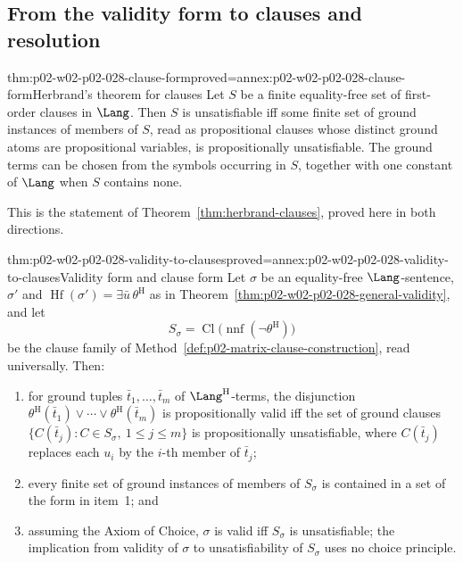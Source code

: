 \subsection{From the validity form to clauses and resolution}
\label{sec:p02-w02-p02-028-clauses}

\begin{hbtheorem}{thm:p02-w02-p02-028-clause-form}{proved=annex:p02-w02-p02-028-clause-form}{Herbrand's theorem for clauses}
Let \(S\) be a finite equality-free set of first-order clauses in \(\Lang\).
Then \(S\) is unsatisfiable iff some finite set of ground instances of
members of \(S\), read as propositional clauses whose distinct ground atoms
are propositional variables, is propositionally unsatisfiable.  The ground
terms can be chosen from the symbols occurring in \(S\), together with one
constant of \(\Lang\) when \(S\) contains none.
\end{hbtheorem}

This is the statement of Theorem~\ref{thm:herbrand-clauses}, proved here in
both directions.

\begin{hbtheorem}{thm:p02-w02-p02-028-validity-to-clauses}{proved=annex:p02-w02-p02-028-validity-to-clauses}{Validity form and clause form}
Let \(\sigma\) be an equality-free \(\Lang\)-sentence, \(\sigma'\) and
\(\operatorname{Hf}(\sigma')=\exists\bar u\,\theta^{\mathrm H}\) as in
Theorem~\ref{thm:p02-w02-p02-028-general-validity}, and let
\[
 S_\sigma=\operatorname{Cl}\bigl(\operatorname{nnf}(\neg\theta^{\mathrm H})\bigr)
\]
be the clause family of Method~\ref{def:p02-matrix-clause-construction}, read
universally.  Then:
\begin{enumerate}
  \item for ground tuples \(\bar t_1,\ldots,\bar t_m\) of
        \(\Lang^{\mathrm H}\)-terms, the disjunction
        \(\theta^{\mathrm H}(\bar t_1)\lor\cdots\lor\theta^{\mathrm H}(\bar t_m)\) is
        propositionally valid iff the set of ground clauses
        \(\{C(\bar t_j):C\in S_\sigma,\ 1\leq j\leq m\}\) is propositionally
        unsatisfiable, where \(C(\bar t_j)\) replaces each \(u_i\) by the
        \(i\)-th member of \(\bar t_j\);
  \item every finite set of ground instances of members of \(S_\sigma\) is
        contained in a set of the form in item~1; and
  \item assuming the Axiom of Choice, \(\sigma\) is valid iff \(S_\sigma\) is
        unsatisfiable; the implication from validity of \(\sigma\) to
        unsatisfiability of \(S_\sigma\) uses no choice principle.
\end{enumerate}
\end{hbtheorem}

